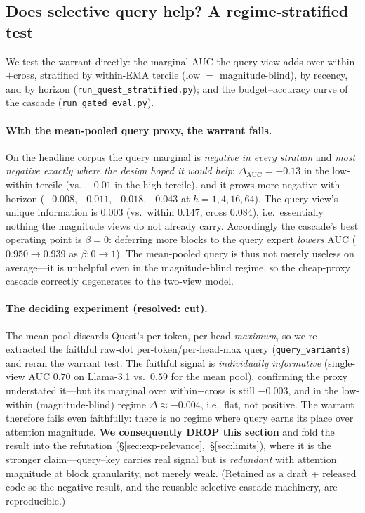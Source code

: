 \subsection{Does selective query help? A regime-stratified test}
We test the warrant directly: the marginal AUC the query view adds over
within$+$cross, stratified by within-EMA tercile (low $=$ magnitude-blind), by
recency, and by horizon (\texttt{run\_quest\_stratified.py}); and the
budget--accuracy curve of the cascade (\texttt{run\_gated\_eval.py}).

\paragraph{With the mean-pooled query proxy, the warrant fails.}
On the headline corpus the query marginal is \emph{negative in every stratum} and
\emph{most negative exactly where the design hoped it would help}: $\Delta_{\text{AUC}}
=-0.13$ in the low-within tercile (vs.\ $-0.01$ in the high tercile), and it grows
more negative with horizon ($-0.008,-0.011,-0.018,-0.043$ at $h{=}1,4,16,64$). The
query view's unique information is $0.003$ (vs.\ within $0.147$, cross $0.084$),
i.e.\ essentially nothing the magnitude views do not already carry. Accordingly
the cascade's best operating point is $\beta{=}0$: deferring more blocks to the
query expert \emph{lowers} AUC ($0.950\!\to\!0.939$ as $\beta:0\!\to\!1$). The
mean-pooled query is thus not merely useless on average---it is unhelpful even in
the magnitude-blind regime, so the cheap-proxy cascade correctly degenerates to
the two-view model.

\paragraph{The deciding experiment (resolved: cut).}
The mean pool discards Quest's per-token, per-head \emph{maximum}, so we
re-extracted the faithful raw-dot per-token/per-head-max query
(\texttt{query\_variants}) and reran the warrant test. The faithful signal is
\emph{individually informative} (single-view AUC $0.70$ on Llama-3.1 vs.\ $0.59$
for the mean pool), confirming the proxy understated it---but its marginal over
within$+$cross is still $-0.003$, and in the low-within (magnitude-blind) regime
$\Delta\approx-0.004$, i.e.\ flat, not positive. The warrant therefore fails even
faithfully: there is no regime where query earns its place over attention
magnitude. \textbf{We consequently DROP this section} and fold the result into the
refutation (\S\ref{sec:exp-relevance},~\S\ref{sec:limits}), where it is the
stronger claim---query--key carries real signal but is \emph{redundant} with
attention magnitude at block granularity, not merely weak. (Retained as a draft +
released code so the negative result, and the reusable selective-cascade
machinery, are reproducible.)
